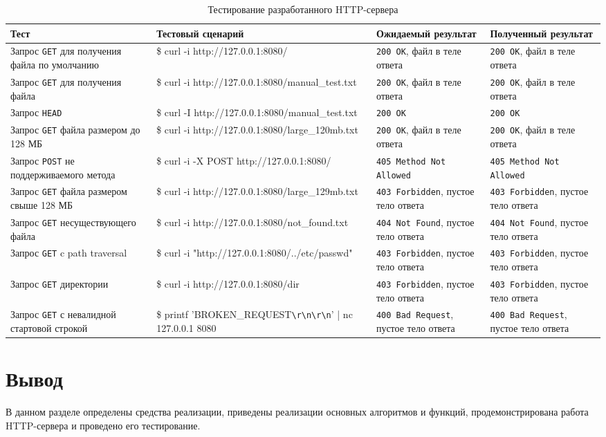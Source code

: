 \begin{table}
	\centering
	\caption{Тестирование разработанного HTTP-сервера}
	\begin{tabular}{|p{5.5cm}|p{8cm}|p{5cm}|p{5cm}|}
		\hline
		Тест & Тестовый сценарий & Ожидаемый результат & Полученный результат\\\hline
		Запрос \texttt{GET} для получения файла по умолчанию & \$ curl -i http://127.0.0.1:8080/  & \texttt{200 OK}, файл в теле ответа & \texttt{200 OK}, файл в теле ответа \\\hline
		Запрос \texttt{GET} для получения файла & 
		\$ curl -i http://127.0.0.1:8080/manual\_test.txt & \texttt{200 OK}, файл в теле ответа & \texttt{200 OK}, файл в теле ответа \\\hline
		Запрос \texttt{HEAD}  & 
		\$ curl -I http://127.0.0.1:8080/manual\_test.txt & \texttt{200 OK} & \texttt{200 OK} \\\hline
		Запрос \texttt{GET} файла размером до 128 МБ  & 
		\$ curl -i http://127.0.0.1:8080/large\_120mb.txt & \texttt{200 OK}, файл в теле ответа & \texttt{200 OK}, файл в теле ответа \\\hline
		Запрос \texttt{POST} не поддерживаемого метода & \$ curl -i -X POST http://127.0.0.1:8080/ & \texttt{405 Method Not Allowed} & \texttt{405 Method Not Allowed} \\\hline
		Запрос \texttt{GET} файла размером свыше 128 МБ & 
		\$ curl -i http://127.0.0.1:8080/large\_129mb.txt & \texttt{403 Forbidden}, пустое тело ответа & \texttt{403 Forbidden}, пустое тело ответа \\\hline
		Запрос \texttt{GET} несуществующего файла  & 
		\$ curl -i http://127.0.0.1:8080/not\_found.txt & \texttt{404 Not Found}, пустое тело ответа & \texttt{404 Not Found}, пустое тело ответа \\\hline
		Запрос \texttt{GET} c path traversal & 
		\$ curl -i "http://127.0.0.1:8080/.{}./etc/passwd" & \texttt{403 Forbidden}, пустое тело ответа & \texttt{403 Forbidden}, пустое тело ответа \\\hline
		Запрос \texttt{GET} директории & \$ curl -i http://127.0.0.1:8080/dir & \texttt{403 Forbidden}, пустое тело ответа & \texttt{403 Forbidden}, пустое тело ответа \\\hline
		Запрос \texttt{GET} с невалидной стартовой строкой & \$ printf 'BROKEN\_REQUEST\verb|\r\n\r\n|' | nc 127.0.0.1 8080 & \texttt{400 Bad Request}, пустое тело ответа & \texttt{400 Bad Request}, пустое тело ответа \\\hline
	\end{tabular}
	\label{tab:tests}
\end{table}

\section*{Вывод}

В данном разделе определены средства реализации, приведены реализации основных алгоритмов и функций, продемонстрирована работа HTTP-сервера и проведено его тестирование.
\clearpage
